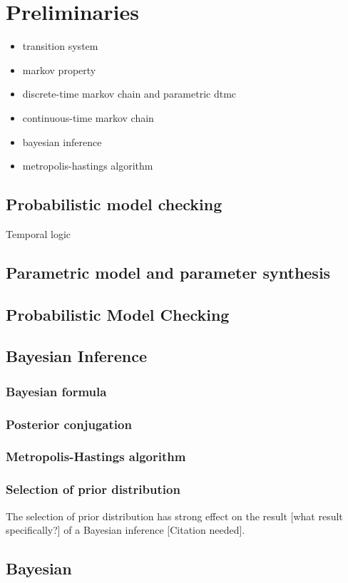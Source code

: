 \chapter{Preliminaries}
 {\color{red}
  \begin{itemize}
      \item transition system
      \item markov property
      \item discrete-time markov chain and parametric dtmc
      \item continuous-time markov chain
      \item bayesian inference
      \item metropolis-hastings algorithm
  \end{itemize}
 }

\section{Probabilistic model checking}
Temporal logic






\section{Parametric model and parameter synthesis}

\section{Probabilistic Model Checking}


\section{Bayesian Inference}
\subsection{Bayesian formula}
\subsection{Posterior conjugation}
\subsection{Metropolis-Hastings algorithm}
\subsection{Selection of prior distribution}
The selection of prior distribution has strong effect on the result [what result
        specifically?] of a Bayesian inference {\color{red}[Citation needed]}.

\section{Bayesian }